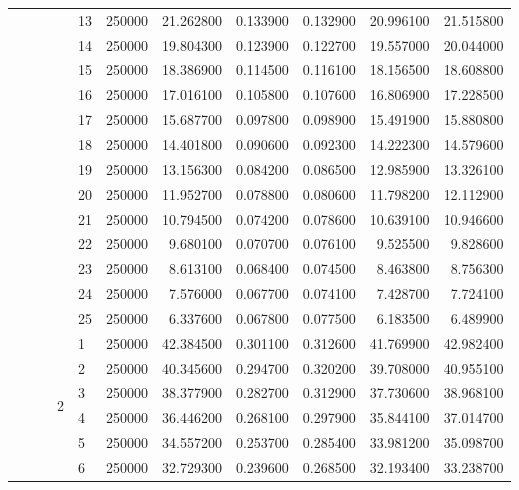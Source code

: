 \begin{tabular}{llllllrrrrr}
\cline{5-11}
 &  &  &  & 13 & 250000 & 21.262800 & 0.133900 & 0.132900 & 20.996100 & 21.515800 \\
\cline{5-11}
 &  &  &  & 14 & 250000 & 19.804300 & 0.123900 & 0.122700 & 19.557000 & 20.044000 \\
\cline{5-11}
 &  &  &  & 15 & 250000 & 18.386900 & 0.114500 & 0.116100 & 18.156500 & 18.608800 \\
\cline{5-11}
 &  &  &  & 16 & 250000 & 17.016100 & 0.105800 & 0.107600 & 16.806900 & 17.228500 \\
\cline{5-11}
 &  &  &  & 17 & 250000 & 15.687700 & 0.097800 & 0.098900 & 15.491900 & 15.880800 \\
\cline{5-11}
 &  &  &  & 18 & 250000 & 14.401800 & 0.090600 & 0.092300 & 14.222300 & 14.579600 \\
\cline{5-11}
 &  &  &  & 19 & 250000 & 13.156300 & 0.084200 & 0.086500 & 12.985900 & 13.326100 \\
\cline{5-11}
 &  &  &  & 20 & 250000 & 11.952700 & 0.078800 & 0.080600 & 11.798200 & 12.112900 \\
\cline{5-11}
 &  &  &  & 21 & 250000 & 10.794500 & 0.074200 & 0.078600 & 10.639100 & 10.946600 \\
\cline{5-11}
 &  &  &  & 22 & 250000 & 9.680100 & 0.070700 & 0.076100 & 9.525500 & 9.828600 \\
\cline{5-11}
 &  &  &  & 23 & 250000 & 8.613100 & 0.068400 & 0.074500 & 8.463800 & 8.756300 \\
\cline{5-11}
 &  &  &  & 24 & 250000 & 7.576000 & 0.067700 & 0.074100 & 7.428700 & 7.724100 \\
\cline{5-11}
 &  &  &  & 25 & 250000 & 6.337600 & 0.067800 & 0.077500 & 6.183500 & 6.489900 \\
\cline{4-11} \cline{5-11}
 &  &  & \multirow[t]{25}{*}{2} & 1 & 250000 & 42.384500 & 0.301100 & 0.312600 & 41.769900 & 42.982400 \\
\cline{5-11}
 &  &  &  & 2 & 250000 & 40.345600 & 0.294700 & 0.320200 & 39.708000 & 40.955100 \\
\cline{5-11}
 &  &  &  & 3 & 250000 & 38.377900 & 0.282700 & 0.312900 & 37.730600 & 38.968100 \\
\cline{5-11}
 &  &  &  & 4 & 250000 & 36.446200 & 0.268100 & 0.297900 & 35.844100 & 37.014700 \\
\cline{5-11}
 &  &  &  & 5 & 250000 & 34.557200 & 0.253700 & 0.285400 & 33.981200 & 35.098700 \\
\cline{5-11}
 &  &  &  & 6 & 250000 & 32.729300 & 0.239600 & 0.268500 & 32.193400 & 33.238700 \\

\end{tabular}

